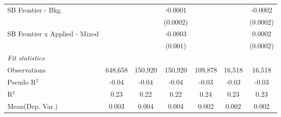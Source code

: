 \begin{tabular}{lcccccc}
   SB Frontier - Bkg.            &               &               & -0.0001         &               &               & -0.0002\\   
                                 &               &               & (0.0002)        &               &               & (0.0002)\\   
   SB Frontier x Applied - Mixed &               &               & -0.0003         &               &               & 0.0002\\   
                                 &               &               & (0.001)         &               &               & (0.0002)\\   
   \midrule
   \emph{Fit statistics}\\
   Observations                  & 648,658       & 150,920       & 150,920         & 109,878       & 16,518        & 16,518\\  
   Pseudo R$^2$                  & -0.04         & -0.04         & -0.04           & -0.03         & -0.03         & -0.03\\  
   R$^2$                         & 0.23          & 0.22          & 0.22            & 0.24          & 0.23          & 0.23\\  
Mean(Dep. Var.) & 0.003 & 0.004 & 0.004 & 0.002 & 0.002 & 0.002 \\
   

\end{tabular}

